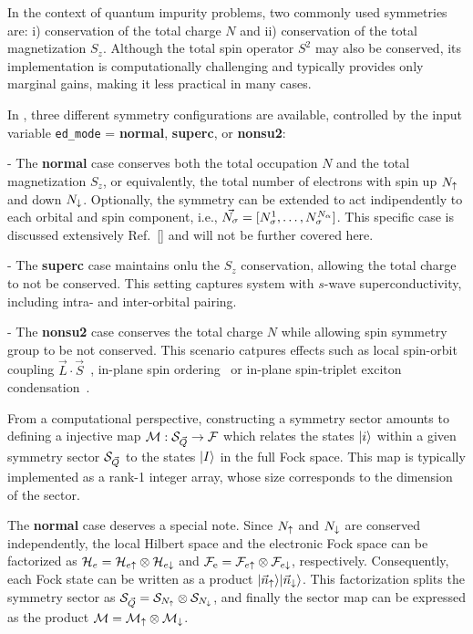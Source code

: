 \documentclass[edipack2.tex]{subfiles}
\begin{document}
In the context of quantum impurity problems, two commonly used 
symmetries are: i) conservation of the total charge $N$ and ii) 
conservation of the total magnetization $S_z$. Although the total 
spin operator $S^2$ may also be conserved, its implementation is 
computationally challenging and typically provides only marginal 
gains, making it less practical in many cases.

In \NAME, three different symmetry configurations are available, 
controlled by the input variable {\tt ed\_mode} = {\bf normal}, 
{\bf superc}, or {\bf nonsu2}:


 - The {\bf normal} case conserves both the total occupation $N$
and the total magnetization $S_z$, or equivalently, the total number
of electrons with spin up $N_\uparrow$ and down $N_\downarrow$.
Optionally, the symmetry
can be extended to act indipendently to each orbital and spin
component, i.e., $\vec{N_\sigma}=[N^1_\sigma,\dots,N^{N_\alpha}_\sigma]$. This
specific case is discussed extensively
Ref.~[] and will not be further covered here.

%

- The {\bf superc} case maintains onlu the $S_z$ conservation,
allowing the total charge to not be conserved. This setting captures
system with $s$-wave superconductivity, including 
intra- and inter-orbital pairing.

- The {\bf nonsu2} case conserves the total
charge $N$ while allowing spin symmetry group to be not conserved.
This scenario catpures effects such as local spin-orbit coupling
$\vec{L}\cdot\vec{S}$~\cite{something}, in-plane spin ordering~\cite{BellomiaKMH} or
in-plane spin-triplet exciton condensation~\cite{Amaricci2023_excitons,Blason}.  


From a computational perspective, constructing a symmetry
sector amounts to defining a injective map
${\cal M}:{\cal S}_{\vec{Q}}\rightarrow {\cal F}$ which relates the states $|i\rangle$
within a given symmetry sector ${\cal S}_{\vec{Q}}$ to the states $|I\rangle$ in the
full Fock space.
This map is typically implemented as a rank-1
integer array, whose size corresponds to the dimension of the sector. 


The {\bf normal} case deserves a special note. Since $N_\uparrow$ and
$N_\downarrow$ are conserved independently, the local Hilbert
space and the electronic Fock space can be factorized as
${\cal H}_e={\cal H}_{e\uparrow}\otimes{\cal H}_{e\downarrow}$ and ${\cal F}_\mathrm{e} = {\cal F}_{e\uparrow}\otimes {\cal F}_{e\downarrow}$, respectively.  
Consequently, each Fock state can be written as a product
$|\vec{n}_\uparrow\rangle |\vec{n}_\downarrow\rangle$. This factorization splits the
symmetry sector as ${\cal S}_{\vec{Q}} = {\cal S}_{N_\uparrow}\otimes{\cal S}_{N_\downarrow}$,
and finally the sector map can be expressed as the product ${\cal M} = {\cal M}_\uparrow
\otimes {\cal M}_\downarrow$.
\end{document}
